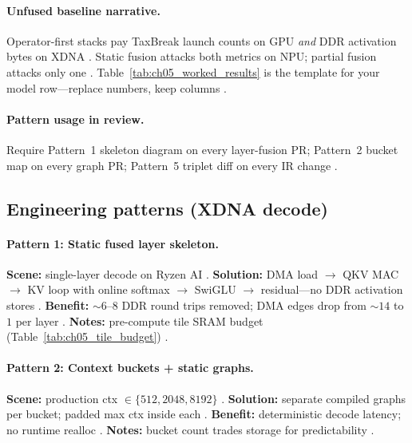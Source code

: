 \paragraph{Unfused baseline narrative.}
Operator-first stacks pay TaxBreak launch counts on GPU \emph{and} DDR activation bytes on XDNA \citep{taxbreak2026,memoryfloor2026}.
Static fusion attacks both metrics on NPU; partial fusion attacks only one \citep{yirage2026,amd2024xdna}.
Table~\ref{tab:ch05_worked_results} is the template for your model row---replace numbers, keep columns \citep{patel2025llminference,chen2020compilerbasedhardw}.

\paragraph{Pattern usage in review.}
Require Pattern~1 skeleton diagram on every layer-fusion PR; Pattern~2 bucket map on every graph PR; Pattern~5 triplet diff on every IR change \citep{yirage2026,chen2020compilerbasedhardw,taxbreak2026,memoryfloor2026,patel2025llminference,amd2024aie}.

\subsection{Engineering patterns (XDNA decode)}
\paragraph{Pattern 1: Static fused layer skeleton.}
\textbf{Scene:} single-layer decode on Ryzen AI \citep{taxbreak2026}.
\textbf{Solution:} DMA load $\rightarrow$ QKV MAC $\rightarrow$ KV loop with online softmax $\rightarrow$ SwiGLU $\rightarrow$ residual---no DDR activation stores \citep{dao2022flashattention,amd2024aie}.
\textbf{Benefit:} ${\sim}6$--$8$ DDR round trips removed; DMA edges drop from ${\sim}14$ to $1$ per layer \citep{memoryfloor2026}.
\textbf{Notes:} pre-compute tile SRAM budget (Table~\ref{tab:ch05_tile_budget}) \citep{yirage2026}.

\paragraph{Pattern 2: Context buckets + static graphs.}
\textbf{Scene:} production ctx $\in\{512,2048,8192\}$ \citep{kwon2023vllm,amd2024xdna}.
\textbf{Solution:} separate compiled graphs per bucket; padded max ctx inside each \citep{yirage2026}.
\textbf{Benefit:} deterministic decode latency; no runtime realloc \citep{patel2025llminference}.
\textbf{Notes:} bucket count trades storage for predictability \citep{amd2024aie}.

